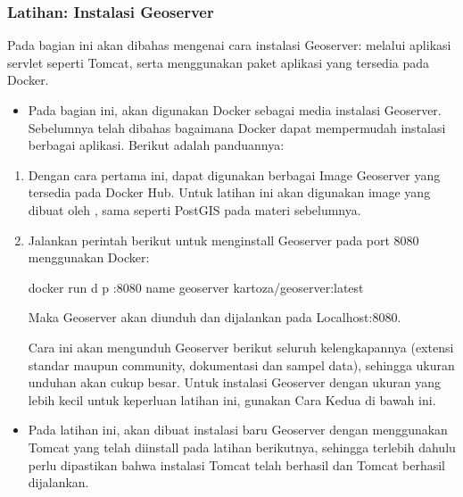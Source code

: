 \documentclass[letterpaper,10pt,english]{sphinxmanual}
\begin{document}
\subsubsection{Latihan: Instalasi Geoserver}
\label{\detokenize{sesi3/interoperabilitas:latihan-instalasi-geoserver}}
Pada bagian ini akan dibahas mengenai cara instalasi Geoserver: melalui aplikasi servlet seperti Tomcat, serta menggunakan paket aplikasi yang tersedia pada Docker.
\begin{itemize}
\item {} 
Pada bagian ini, akan digunakan Docker sebagai media instalasi Geoserver. Sebelumnya telah dibahas bagaimana Docker dapat mempermudah instalasi berbagai aplikasi. Berikut adalah panduannya:

\end{itemize}
\begin{enumerate}
%
\item {} 
Dengan cara pertama ini, dapat digunakan berbagai Image Geoserver yang tersedia pada Docker Hub. Untuk latihan ini akan digunakan image yang dibuat oleh , sama seperti PostGIS pada materi sebelumnya.

\item {} 
Jalankan perintah berikut untuk menginstall Geoserver pada port 8080 menggunakan Docker:

\begin{sphinxVerbatim}[commandchars=\\\{\}]
docker run \PYGZhy{}d \PYGZhy{}p :8080 \PYGZhy{}\PYGZhy{}name geoserver kartoza/geoserver:latest 
\end{sphinxVerbatim}

Maka Geoserver akan diunduh dan dijalankan pada Localhost:8080.

Cara ini akan mengunduh Geoserver berikut seluruh kelengkapannya (extensi standar maupun community, dokumentasi dan sampel data), sehingga ukuran unduhan akan cukup besar. Untuk instalasi Geoserver dengan ukuran yang lebih kecil untuk keperluan latihan ini, gunakan Cara Kedua di bawah ini.

\end{enumerate}
\begin{itemize}
\item {} 
Pada latihan ini, akan dibuat instalasi baru Geoserver dengan menggunakan Tomcat yang telah diinstall pada latihan berikutnya, sehingga terlebih dahulu perlu dipastikan bahwa instalasi Tomcat telah berhasil dan Tomcat berhasil dijalankan.

\end{itemize}
\end{document}

